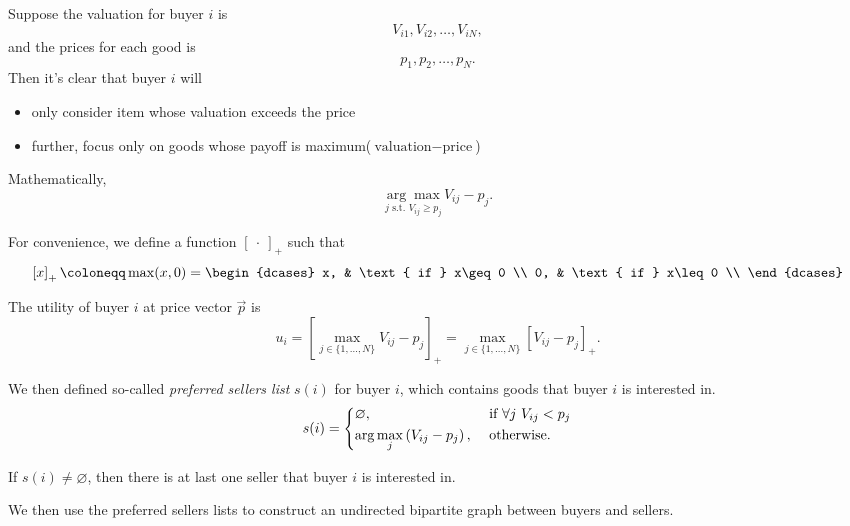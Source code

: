 \begin{answer}
	Suppose the valuation for buyer \(i\) is
	\[
		V_{i1}, V_{i2}, \ldots , V_{iN},
	\]
	and the prices for each good is
	\[
		p_{1}, p_2, \ldots , p_{N}.
	\]
	Then it's clear that buyer \(i\) will
	\begin{itemize}
		\item only consider item whose valuation exceeds the price
		\item further, focus only on goods whose payoff is maximum(\(\text{valuation}-\text{price}\))
	\end{itemize}
	Mathematically,
	\[
		\underset{j \text{ s.t. }V_{ij}\geq p_{j}}{\arg\max} V_{ij} - p_{j}.
	\]

	For convenience, we define a function \(\left[\ \cdot\ \right]_+\) such that
	\[
		\left[ x \right]_+ \coloneqq \max(x, 0) = \begin{dcases}
			x, & \text{ if } x\geq 0 \\
			0, & \text{ if } x\leq 0 \\
		\end{dcases}
	\]

	The utility of buyer \(i\) at price vector \(\vec{p}\) is
	\[
		u_{i} = \left[\max_{j\in\{1, \ldots , N\}} V_{ij} - p_{j}\right]_+ = \max_{j\in \{1, \ldots , N\}}\left[V_{ij}-p_{j}\right]_+.
	\]

	We then defined so-called \emph{preferred sellers list} \(s(i)\) for buyer \(i\), which contains goods that buyer \(i\) is interested in.
	\[
		s(i) = \begin{dcases}
			\varnothing ,                           & \text{ if }  \forall j\ V_{ij}<p_{j} \\
			\arg\max_j \left(V_{ij} - p_{j}\right), & \text{ otherwise}.
		\end{dcases}
	\]

	\begin{remark}
		If \(s(i)\neq \varnothing \), then there is at last one seller that buyer \(i\) is interested in.
	\end{remark}

	We then use the preferred sellers lists to construct an undirected bipartite graph between buyers and sellers.
\end{answer}

